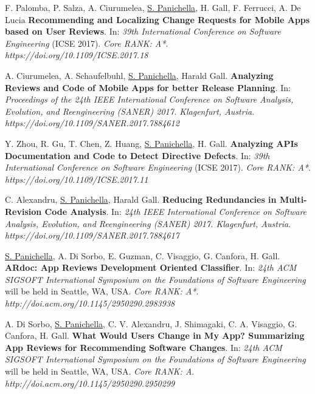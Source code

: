 \documentclass[10pt]{article}
\begin{document}
\begin{bibenum}
\item  \label{C3} F. Palomba, P. Salza, A. Ciurumelea,  \underline{S. Panichella}, H. Gall, F. Ferrucci,  A. De Lucia   \textbf{Recommending and Localizing Change Requests for Mobile Apps based on User Reviews}.    In: \emph{39th International Conference on Software Engineering} (ICSE 2017).  \textit{Core RANK: A*}. \\\textit{https://doi.org/10.1109/ICSE.2017.18}
       \item   \label{C5}    A. Ciurumelea, A. Schaufelbuhl, \underline{S. Panichella}, Harald Gall. \textbf{ Analyzing Reviews and Code of Mobile Apps for better Release Planning}. In: \emph{Proceedings of the 24th IEEE International Conference on Software Analysis, Evolution, and Reengineering (SANER) 2017. Klagenfurt, Austria}. \\\textit{https://doi.org/10.1109/SANER.2017.7884612} %
  \item  \label{C4} Y. Zhou, R. Gu, T. Chen, Z. Huang,  \underline{S. Panichella}, H. Gall.   \textbf{Analyzing APIs Documentation and Code to Detect Directive Defects}.    In: \emph{39th International Conference on Software Engineering} (ICSE 2017).  \textit{Core RANK: A*}. \\\textit{https://doi.org/10.1109/ICSE.2017.11}
   \item   \label{C6}    C. Alexandru,  \underline{S. Panichella}, Harald Gall. \textbf{Reducing Redundancies in Multi-Revision Code Analysis}. In: \emph{24th IEEE International Conference on Software Analysis, Evolution, and Reengineering  (SANER) 2017. Klagenfurt, Austria}.  
                \\\textit{https://doi.org/10.1109/SANER.2017.7884617} 
              
    \item  \label{C7}  \underline{S. Panichella}, A. Di Sorbo, E. Guzman, C. Visaggio, G. Canfora, H. Gall.
         \textbf{ARdoc: App Reviews Development Oriented Classifier}.  In: \emph{24th ACM SIGSOFT International Symposium on the Foundations of Software Engineering}  will be held in Seattle, WA, USA.  \textit{Core RANK: A*}.
          \\\textit{http://doi.acm.org/10.1145/2950290.2983938}
  
      \item  \label{C8}  A. Di Sorbo,  \underline{S. Panichella}, C. V. Alexandru, J. Shimagaki, C. A. Visaggio, G. Canfora, H. Gall.
         \textbf{What Would Users Change in My App? Summarizing App
Reviews for Recommending Software Changes}.  In: \emph{24th ACM SIGSOFT International Symposium on the Foundations of Software Engineering}  will be held in Seattle, WA, USA.  \textit{Core RANK: A}. \\\textit{http://doi.acm.org/10.1145/2950290.2950299}


\end{bibenum}
\end{document}
